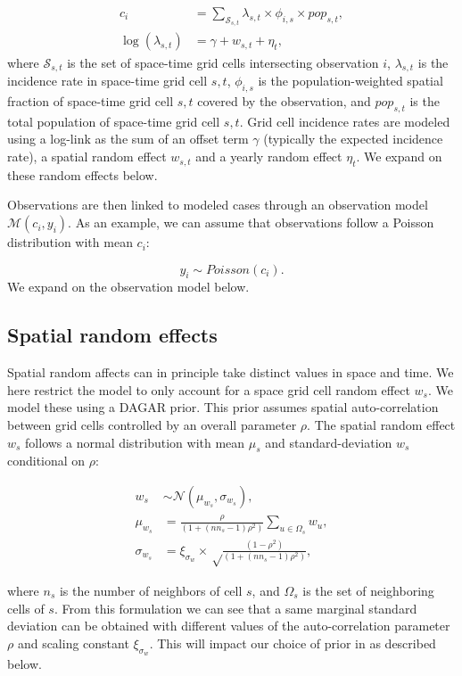 \documentclass[
]{article}
\begin{document}
\[
\begin{aligned}
c_i &= \sum_{\mathcal{S}_{s,t}} \lambda_{s,t} \times \phi_{i,s} \times pop_{s,t},\\
\log(\lambda_{s,t}) &= \gamma + w_{s,t} + \eta_t,
\end{aligned}
\]
where \(\mathcal{S}_{s,t}\) is the set of space-time grid cells intersecting observation \(i\), \(\lambda_{s,t}\) is the incidence rate in space-time grid cell \(s,t\), \(\phi_{i,s}\) is the population-weighted spatial fraction of space-time grid cell \(s,t\) covered by the observation, and \(pop_{s,t}\) is the total population of space-time grid cell \(s,t\). Grid cell incidence rates are modeled using a log-link as the sum of an offset term \(\gamma\) (typically the expected incidence rate), a spatial random effect \(w_{s,t}\) and a yearly random effect \(\eta_t\). We expand on these random effects below.

Observations are then linked to modeled cases through an observation model \(\mathcal{M}(c_i, y_i)\). As an example, we can assume that observations follow a Poisson distribution with mean \(c_i\):

\[
y_i \sim Poisson(c_i).
\]
We expand on the observation model below.

\hypertarget{spatial-random-effects}{%
\subsection{Spatial random effects}\label{spatial-random-effects}}

Spatial random affects can in principle take distinct values in space and time. We here restrict the model to only account for a space grid cell random effect \(w_s\). We model these using a DAGAR prior. This prior assumes spatial auto-correlation between grid cells controlled by an overall parameter \(\rho\). The spatial random effect \(w_s\) follows a normal distribution with mean \(\mu_s\) and standard-deviation \(w_s\) conditional on \(\rho\):

\[
\begin{aligned}
w_s & \sim \mathcal{N}(\mu_{w_s}, \sigma_{w_s}),\\
\mu_{w_s} &=\frac{\rho}{(1 + (nn_s - 1) \rho^2)} \sum_{u \in \Omega_s} w_u, \\
\sigma_{w_s} &= \xi_{\sigma_w} \times \sqrt\frac{(1 - \rho^2)}{(1 + (nn_s - 1)  \rho^2)},
\end{aligned}
\]

where \(n_s\) is the number of neighbors of cell \(s\), and \(\Omega_s\) is the set of neighboring cells of \(s\). From this formulation we can see that a same marginal standard deviation can be obtained with different values of the auto-correlation parameter \(\rho\) and scaling constant \(\xi_{\sigma_w}\). This will impact our choice of prior in as described below.
\end{document}
